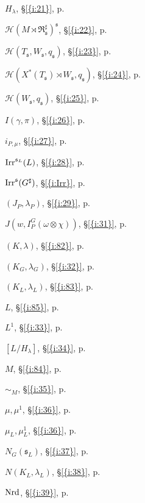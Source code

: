 \documentclass[11pt]{amsart}
\theoremstyle{definition}
\begin{document}
\begin{Parallel}[v]{0.48\textwidth}{0.48\textwidth}
{$H_{\lambda}$, {\S \ref{{i:21}}, p. }

$\mathcal{H}(M \rtimes \mathfrak{R}^{\sharp}_{{\mathfrak s}})^{{\mathfrak s}}$, {\S \ref{{i:22}}, p. }

$\mathcal{H}(T_{{\mathfrak s}}, W_{{\mathfrak s}}, q_{{\mathfrak s}})$, {\S \ref{{i:23}}, p. }

$\mathcal{H}(X^*(T_{{\mathfrak s}}) \rtimes W_{{\mathfrak s}}, q_{{\mathfrak s}})$, {\S \ref{{i:24}}, p. }

$\mathcal{H}(W_{{\mathfrak s}}, q_{{\mathfrak s}})$, {\S \ref{{i:25}}, p. }

$I(\gamma,\pi)$, {\S \ref{{i:26}}, p. }

$i_{P, \mu}$, {\S \ref{{i:27}}, p. }

${{\rm Irr}}^{{{\mathfrak s}}_L}(L)$, {\S \ref{{i:28}}, p. }

${{\rm Irr}}^{{\mathfrak s}}(G^\sharp)$, {\S \ref{{i:Irr}}, p. }

$(J_P, \lambda_P)$, {\S \ref{{i:29}}, p. }

$J(w, I^G_P(\omega \otimes \chi))$, {\S \ref{{i:31}}, p. }

$(K,\lambda)$, {\S \ref{{i:82}}, p. }

$(K_G, \lambda_G)$, {\S \ref{{i:32}}, p. }

$(K_L, \lambda_L)$, {\S \ref{{i:83}}, p. }

$L$, {\S \ref{{i:85}}, p. }

$L^1$, {\S \ref{{i:33}}, p. }

$[L/H_{\lambda}]$, {\S \ref{{i:34}}, p. }

$M$, {\S \ref{{i:84}}, p. }

$\sim_{M}$, {\S \ref{{i:35}}, p. }

$\mu, \mu^1$, {\S \ref{{i:36}}, p. }

$\mu_L, \mu^1_L$, {\S \ref{{i:36}}, p. }

$N_G({{\mathfrak s}}_L)$, {\S \ref{{i:37}}, p. }

$N(K_L, \lambda_L)$, {\S \ref{{i:38}}, p. }

${{\rm Nrd}}$, {\S \ref{{i:39}}, p. } 
} \ParallelRText{

}
\end{Parallel}
\end{document}
